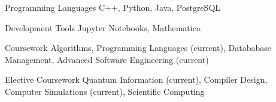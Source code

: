 


\begin{cvskills}

  \cvskill
    {Programming Languages}
    {C++, Python, Java, PostgreSQL}

  \cvskill
    {Development Tools}
    {Jupyter Notebooks, Mathematica}

  \cvskill
    {Coursework}
    {Algorithms, Programming Languages (current), Datababase Management, Advanced Software Engineering (current)}

  \cvskill
    {Elective Coursework}
    {Quantum Information (current), Compiler Design, Computer Simulations (current), Scientific Computing}

\end{cvskills}
